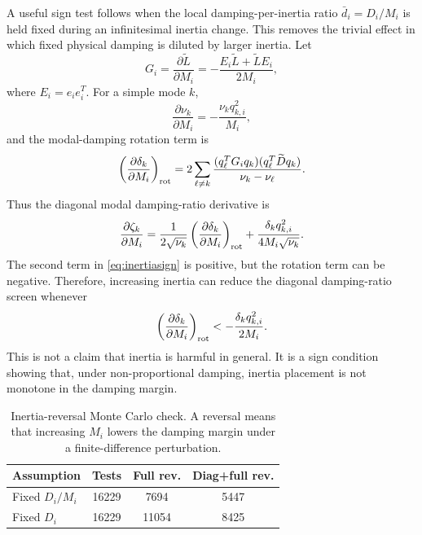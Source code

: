 \documentclass[journal]{IEEEtran}
\newcommand{\Lt}{\widetilde L}
\newcommand{\Dt}{\widetilde D}
\begin{document}
A useful sign test follows when the local damping-per-inertia ratio
$\bar d_i=D_i/M_i$ is held fixed during an infinitesimal inertia change. This
removes the trivial effect in which fixed physical damping is diluted by larger
inertia. Let
\begin{equation}
G_i=\frac{\partial \Lt}{\partial M_i}
=-\frac{E_i\Lt+\Lt E_i}{2M_i},
\end{equation}
where $E_i=e_ie_i^T$. For a simple mode $k$,
\begin{equation}
\frac{\partial \nu_k}{\partial M_i}=-\frac{\nu_k q_{k,i}^2}{M_i},
\end{equation}
and the modal-damping rotation term is
\begin{equation}
\left(\frac{\partial\delta_k}{\partial M_i}\right)_{\rm rot}
=2\sum_{\ell\neq k}
\frac{(q_\ell^TG_iq_k)(q_\ell^T\Dt q_k)}{\nu_k-\nu_\ell}.
\label{eq:inertiadeltarot}
\end{equation}
Thus the diagonal modal damping-ratio derivative is
\begin{equation}
\frac{\partial\zeta_k}{\partial M_i}
=\frac{1}{2\sqrt{\nu_k}}
\left(\frac{\partial\delta_k}{\partial M_i}\right)_{\rm rot}
+\frac{\delta_k q_{k,i}^2}{4M_i\sqrt{\nu_k}}.
\label{eq:inertiasign}
\end{equation}
The second term in \eqref{eq:inertiasign} is positive, but the rotation term can be negative. Therefore, increasing inertia can reduce the diagonal damping-ratio screen whenever
\begin{equation}
\left(\frac{\partial\delta_k}{\partial M_i}\right)_{\rm rot}
<-\frac{\delta_k q_{k,i}^2}{2M_i}.
\label{eq:inertiareversal}
\end{equation}
This is not a claim that inertia is harmful in general. It is a sign condition showing that, under non-proportional damping, inertia placement is not monotone in the damping margin.

\begin{table}[t]
\centering
\caption{Inertia-reversal Monte Carlo check. A reversal means that increasing $M_i$ lowers the damping margin under a finite-difference perturbation.}
\label{tab:inertiareversal}
\begin{tabular}{lccc}
\toprule
Assumption & Tests & Full rev. & Diag+full rev.\\
\midrule
Fixed $D_i/M_i$ & 16229 & 7694 & 5447\\
Fixed $D_i$ & 16229 & 11054 & 8425\\
\bottomrule
\end{tabular}
\end{table}
\end{document}
